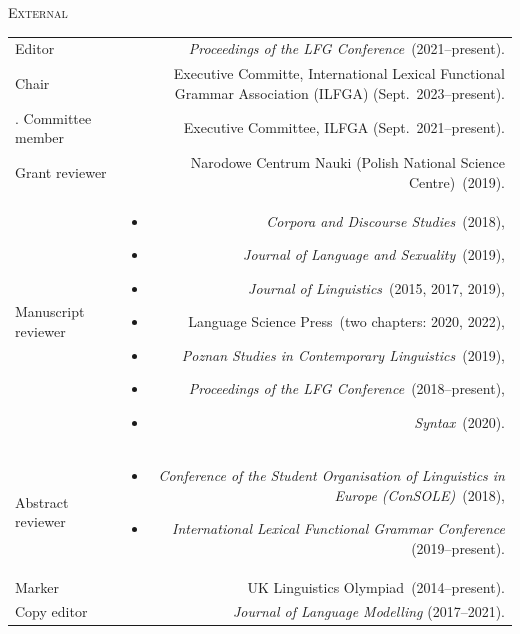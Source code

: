 \documentclass[11pt,a4paper]{article}
\makeatletter
\newlength{\rulelength}%
\newenvironment{cvsection}{%
  \setlength{\extrarowheight}{0.70ex}
  \begin{longtable}[l]{@{} L R @{}}
}{%
  \end{longtable}
}
\newlength{\squish}
\newenvironment{reviewlist}
{%
\vspace*{\squish}%
\begin{itemize}[noitemsep,label={},nosep,left=0pt .. \parindent]%
}
{%
\end{itemize}
}
\newcommand{\Label}[1]{%
\textnormal{#1}%
}
\newcommand{\cvheading}[1]{\noindent{{\color{headercolor}\rule[0.4ex]{\rulelength}{2pt}\hspace*{9pt} \Large #1}}\vspace*{0.5\baselineskip}}
\newcommand{\cvsubhead}[1]{\noindent\hspace*{\rulelength}\hspace*{9pt} \textsc{#1}\vspace*{0.25\baselineskip}}
\makeatother
\begin{document}

\cvheading{Commissions of trust}

\cvsubhead{External}
\begin{cvsection}
  \Label{Editor} & \textit{Proceedings of the LFG Conference}~(2021--present).\\
  \Label{Chair} & Executive Committe, International Lexical Functional Grammar Association (ILFGA) (Sept.~2023--present).\\ .%
  \Label{Committee member} & Executive Committee, ILFGA (Sept.~2021--present).\\
\Label{Grant reviewer} &
                    Narodowe Centrum Nauki (Polish National Science Centre)~(2019).\\
\Label{Manuscript reviewer} &
                \begin{reviewlist}
                \item \textit{Corpora and Discourse Studies}~(2018),
                \item \textit{Journal of Language and Sexuality}~(2019),
                \item \textit{Journal of Linguistics}~(2015, 2017, 2019),
                \item Language Science Press~(two chapters: 2020, 2022),
                \item \textit{Poznan Studies in Contemporary Linguistics}~(2019),
                \item \textit{Proceedings of the LFG Conference}~(2018--present),
                \item  \textit{Syntax}~(2020).
                \end{reviewlist}
                 \\[\squish]
\Label{Abstract reviewer}   &
                \begin{reviewlist}
                \item \textit{Conference of the Student Organisation of Linguistics in Europe (ConSOLE)}~(2018),
                \item \textit{International Lexical Functional Grammar Conference} (2019--present).
                \end{reviewlist}
                \\[\squish]
\Label{Marker}      & UK Linguistics Olympiad~(2014--present).\\
\Label{Copy editor} & \textit{Journal of Language Modelling} (2017--2021).
\end{cvsection}
\end{document}
